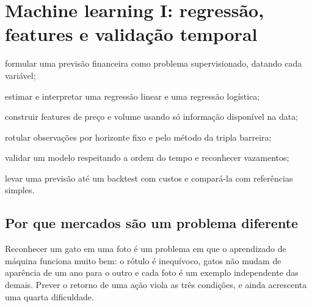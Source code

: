 \chapter{Machine learning I: regressão, features e validação temporal}
\label{cap:ml1}


\begin{objetivos}
  \item formular uma previsão financeira como problema supervisionado, datando cada variável;
  \item estimar e interpretar uma regressão linear e uma regressão logística;
  \item construir features de preço e volume usando só informação disponível na data;
  \item rotular observações por horizonte fixo e pelo método da tripla barreira;
  \item validar um modelo respeitando a ordem do tempo e reconhecer vazamentos;
  \item levar uma previsão até um backtest com custos e compará-la com referências simples.
\end{objetivos}

\section{Por que mercados são um problema diferente}

Reconhecer um gato em uma foto é um problema em que o aprendizado de máquina funciona muito bem: o rótulo é inequívoco, gatos não mudam de aparência de um ano para o outro e cada foto é um exemplo independente das demais. Prever o retorno de uma ação viola as três condições, e ainda acrescenta uma quarta dificuldade.

